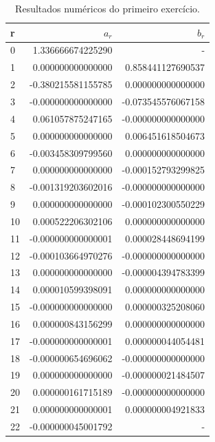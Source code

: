 \documentclass[10pt,a4paper]{article}
\begin{document}
    
    \begin{table}[h]
    \centering
    \caption{Resultados numéricos do primeiro exercício.}
    \label{my-label}
    \begin{tabular}{lrr}
\hline
 r   &   $a_r$               & $b_r$\\
 \hline
 0   &   1.336666674225290   &   -  \\
 1   &   0.000000000000000   &   0.858441127690537  \\
 2   &  -0.380215581155785   &   0.000000000000000  \\
 3   &  -0.000000000000000   &  -0.073545576067158  \\
 4   &   0.061057875247165   &  -0.000000000000000  \\
 5   &   0.000000000000000   &   0.006451618504673  \\
 6   &  -0.003458309799560   &   0.000000000000000  \\
 7   &   0.000000000000000   &  -0.000152793299825  \\
 8   &  -0.001319203602016   &  -0.000000000000000  \\
 9   &   0.000000000000000   &  -0.000102300550229  \\
10   &   0.000522206302106   &   0.000000000000000  \\
11   &  -0.000000000000001   &   0.000028448694199  \\
12   &  -0.000103664970276   &  -0.000000000000000  \\
13   &   0.000000000000000   &  -0.000004394783399  \\
14   &   0.000010599398091   &   0.000000000000000  \\
15   &  -0.000000000000000   &   0.000000325208060  \\
16   &   0.000000843156299   &   0.000000000000000  \\
17   &  -0.000000000000001   &   0.000000044054481  \\
18   &  -0.000000654696062   &  -0.000000000000000  \\
19   &   0.000000000000000   &  -0.000000021484507  \\
20   &   0.000000161715189   &  -0.000000000000000  \\
21   &   0.000000000000001   &   0.000000004921833  \\
22   &  -0.000000045001792   &   -  \\
\hline
    \end{tabular}
    \end{table}
    
\end{document}
